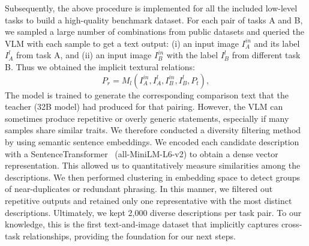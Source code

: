 Subsequently, the above procedure is implemented for all the included low-level tasks to build a high-quality benchmark dataset. For each pair of tasks A and B, we sampled a large number of combinations from public datasets and queried the VLM with each sample to get a text output: (i) an input image $I_A^{in}$ and its label $I_A^{l}$ from task A, and (ii) an input image $I_B^{in}$ with the label $I_B^{l}$ from different task B. Thus we obtained the implicit textural relations:
\begin{equation}
P_r = M_l(I_A^{in}, I_A^{l}, I_B^{in}, I_B^{l}, P_t),
\end{equation}
The model is trained to generate the corresponding comparison text that the teacher (32B model) had produced for that pairing. However, the VLM can sometimes produce repetitive or overly generic statements, especially if many samples share similar traits. We therefore conducted a diversity filtering method by using semantic sentence embeddings. We encoded each candidate description with a SentenceTransformer~\cite{reimers2019sentence} (all-MiniLM-L6-v2) to obtain a dense vector representation. This allowed us to quantitatively measure similarities among the descriptions. We then performed clustering in embedding space to detect groups of near-duplicates or redundant phrasing. In this manner, we filtered out repetitive outputs and retained only one representative with the most distinct descriptions. Ultimately, we kept 2,000 diverse descriptions per task pair. To our knowledge, this is the first text-and-image dataset that implicitly captures cross-task relationships, providing the foundation for our next steps.





